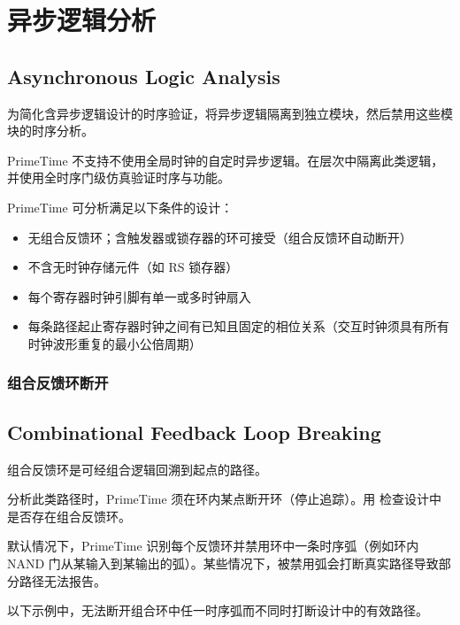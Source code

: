 \section{异步逻辑分析}
\subsection*{Asynchronous Logic Analysis}

为简化含异步逻辑设计的时序验证，将异步逻辑隔离到独立模块，然后禁用这些模块的时序分析。

PrimeTime 不支持不使用全局时钟的自定时异步逻辑。在层次中隔离此类逻辑，并使用全时序门级仿真验证时序与功能。

PrimeTime 可分析满足以下条件的设计：
\begin{itemize}
  \item 无组合反馈环；含触发器或锁存器的环可接受（组合反馈环自动断开）
  \item 不含无时钟存储元件（如 RS 锁存器）
  \item 每个寄存器时钟引脚有单一或多时钟扇入
  \item 每条路径起止寄存器时钟之间有已知且固定的相位关系（交互时钟须具有所有时钟波形重复的最小公倍周期）
\end{itemize}


\subsubsection{组合反馈环断开}
\subsection*{Combinational Feedback Loop Breaking}

组合反馈环是可经组合逻辑回溯到起点的路径。


分析此类路径时，PrimeTime 须在环内某点断开环（停止追踪）。用  检查设计中是否存在组合反馈环。

默认情况下，PrimeTime 识别每个反馈环并禁用环中一条时序弧（例如环内 NAND 门从某输入到某输出的弧）。某些情况下，被禁用弧会打断真实路径导致部分路径无法报告。

以下示例中，无法断开组合环中任一时序弧而不同时打断设计中的有效路径。


